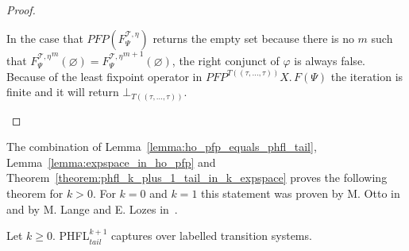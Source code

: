 \begin{proof}
\begin{compactitem}
        In the case that $PFP(F_\Psi^{\mathcal{T},\eta})$ returns the empty set because there is no $m$ such that ${F_\Psi^{\mathcal{T},\eta}}^m(\varnothing) = {F_\Psi^		
       {\mathcal{T},\eta}}^{m+1}(\varnothing)$, the right conjunct of $\varphi$ is always false. Because of the least fixpoint operator in $PFP^{T((\tau, \dots, \tau))} X.\, F(\Psi)$ the iteration is finite and it  will return $\bot_{T((\tau, \dots, \tau))}$.
    \end{compactitem}
\end{proof}

The combination of Lemma~\ref{lemma:ho_pfp_equals_phfl_tail}, Lemma~\ref{lemma:expspace_in_ho_pfp} and 
Theorem~\ref{theorem:phfl_k_plus_1_tail_in_k_expspace} proves the following theorem for $k>0$. For $k = 0$ and $k = 1$ this statement was proven by M. Otto in~\cite{otto1999bisimulation} and by M. Lange and E. Lozes in~\cite{lange2014capturing}.

\begin{theorem}
    Let $k \geq 0$. PHFL$^{k+1}_{tail}$ captures  over labelled transition systems.
\end{theorem}